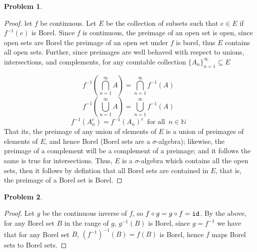 \documentclass{article}
\newcommand{\N}{\mathbb{N}}
\newtheorem{prb}{Problem}
\begin{document}
	    \begin{prb}  \end{prb} 
	    \begin{proof} 
	    	let $f$ be continuous. 
		Let $E$ be the collection of subsets such that $e \in E$ if $f^{-1}(e)$ is Borel. 
		Since $f$ is continuous, the preimage of an open set is open, since 
		open sets are Borel the preimage of an open set under $f$ is borel, thus $E$ contains all open sets. 	
		Further, since preimages are well behaved with respect to
		unions, intersections, and complements, for any countable collection $\{A_n\}_{n = 1}^\infty
		\subseteq E$ 
		
		\[ f^{-1} (\bigcap_{n = 1}^\infty A) = \bigcap_{n = 1}^\infty f^{-1}(A) \] 
		\[ f^{-1} (\bigcup_{n = 1}^\infty A) = \bigcup_{n = 1}^\infty f^{-1}(A) \] 
		\[ f^{-1}(A_n^c) = f^{-1}(A_n)^c \, \text{ for all } \, n \in \N \] 
		That its, 
		the preimage of any union of elements of $E$ is a 
		union of preimages of elements of $E$, and hence Borel (Borel sets are 
		a $\sigma$-algebra); likewise, the preimage of a complement 
		will be a complement of a preimage; and it follows the same is true for intersections. 
		Thus, $E$ is a $\sigma$-algebra which contains all the open sets, then it follows 
		by defintion that all Borel sets are contained in $E$, that is, the preimage of a Borel set is Borel. 
	    \end{proof} 

	    \begin{prb}  \end{prb} 
	    \begin{proof} 
	    	Let $g$ be the continuous inverse of $f$, so $f \circ g = g \circ f = {\tt id} $. By the above, 
		for any Borel set $B$ in the range of $g$, $g^{-1}(B)$ is Borel, since $g = f^{-1}$ we have 
		that for any Borel set $B$, $(f^{-1})^{-1} (B) = f(B)$ is Borel, hence $f$ maps Borel sets to Borel sets. 
	    \end{proof} 
\end{document}
